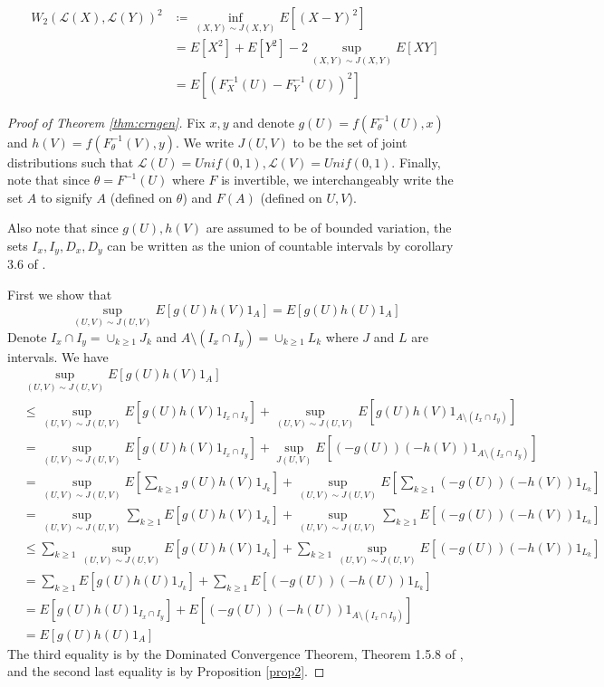 \documentclass{article}
\theoremstyle{plain}%
\theoremstyle{definition}
\theoremstyle{remark}
\begin{document}
	\begin{align}\label{eqn:infdist}
		W_2(\mathcal{L}(X),\mathcal{L}(Y))^2 &\coloneqq\inf_{(X, Y) \sim J (X,Y)}E[(X-Y)^2]\\
		&=E[X^2]+E[Y^2]- 2 \sup_{(X, Y) \sim J (X,Y)}E[XY]\\
		&=E[(F^{-1}_X(U)-F^{-1}_Y(U))^2]
	\end{align}
	
	\begin{proof}[Proof of Theorem \ref{thm:crngen}]
		Fix $x,y$ and denote $g(U) = f(F^{-1}_{\theta}(U), x) $ and  $h(V) = f(F^{-1}_{\theta}(V), y)$. We write $J(U,V)$ to be the set of joint distributions such that $\mathcal{L}(U)= Unif(0,1), \mathcal{L}(V)= Unif(0,1)$. Finally, note that since $\theta=F^{-1}(U)$ where $F$ is invertible, we interchangeably write the set $A$ to signify $A$ (defined on $\theta$) and $F(A)$ (defined on $U,V$). 
		
		Also note that since $g(U),h(V)$ are assumed to be of bounded variation, the sets $I_x,I_y, D_x, D_y$ can be written as the union of countable intervals by corollary 3.6 of \cite{realanalysis}.
		
		First we show that\begin{equation}\label{eqn:equal}
			\sup_{(U, V) \sim J(U,V)} E[g(U)h(V)1_{A}]= E[g(U)h(U)1_{A}]
		\end{equation}
		Denote $I_x\cap I_y = \cup_{k\geq 1}J_k$ and $A \setminus (I_x\cap I_y) = \cup_{k\geq 1}L_k$ where $J$ and $L$ are intervals. We have
		\begin{align*}
			&\sup_{(U, V) \sim J(U,V)} E[g(U)h(V)1_{A}] 
			\\
			&\leq \sup_{(U, V) \sim J(U,V)} E[g(U)h(V)1_{I_x\cap I_y}] + \sup_{(U, V) \sim J(U,V)} E[g(U)h(V)1_{A \setminus (I_x\cap I_y) }] \\
			&= \sup_{(U, V) \sim J(U,V)} E[g(U)h(V)1_{I_x\cap I_y}] + \sup_{J(U,V)} E[(-g(U))(-h(V))1_{A \setminus (I_x\cap I_y) }] \\
			&= \sup_{(U, V) \sim J(U,V)} E[\sum_{k\geq 1}g(U)h(V)1_{J_k}] + \sup_{(U, V) \sim J(U,V)} E[\sum_{k\geq 1}(-g(U))(-h(V))1_{L_k}] \\
			&= \sup_{(U, V) \sim J(U,V)} \sum_{k\geq 1}E[g(U)h(V)1_{J_k}] + \sup_{(U, V) \sim J(U,V)} \sum_{k\geq 1}E[(-g(U))(-h(V))1_{L_k}] \\
			&\leq \sum_{k\geq 1}\sup_{(U, V) \sim J(U,V)}E[g(U)h(V)1_{J_k}] + \sum_{k\geq 1}\sup_{(U, V) \sim J(U,V)}E[(-g(U))(-h(V))1_{L_k}] \\
			&= \sum_{k\geq 1}E[g(U)h(U)1_{J_k}] + \sum_{k\geq 1}E[(-g(U))(-h(U))1_{L_k}] \\
			&= E[g(U)h(U)1_{I_x\cap I_y}] + E[(-g(U))(-h(U))1_{A \setminus (I_x\cap I_y) }]\\
			&= E[g(U)h(U)1_{A}]
		\end{align*}
		The third equality is by the Dominated Convergence Theorem, Theorem 1.5.8 of \cite{durrett}, and the second last equality is by Proposition \ref{prop2}.
		

\end{proof}
\end{document}
